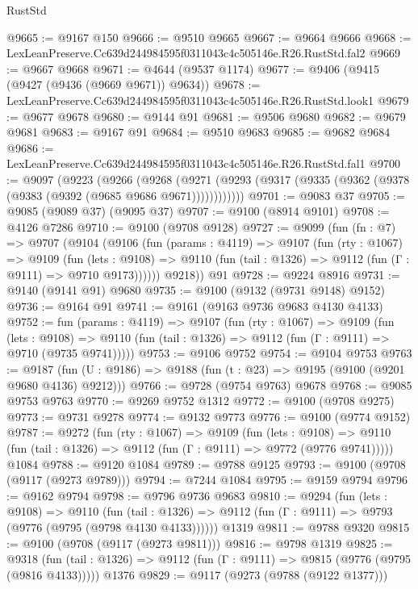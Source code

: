 \begin{lexlean}{RustStd}
\begin{coremodule}
@9665 := @9167 @150
@9666 := @9510 @9665
@9667 := @9664 @9666
@9668 := LexLeanPreserve.Cc639d244984595f0311043c4c505146e.R26.RustStd.fal2
@9669 := @9667 @9668
@9671 := @4644 (@9537 @1174)
@9677 := @9406 (@9415 (@9427 (@9436 (@9669 @9671)) @9634))
@9678 := LexLeanPreserve.Cc639d244984595f0311043c4c505146e.R26.RustStd.look1
@9679 := @9677 @9678
@9680 := @9144 @91
@9681 := @9506 @9680
@9682 := @9679 @9681
@9683 := @9167 @91
@9684 := @9510 @9683
@9685 := @9682 @9684
@9686 := LexLeanPreserve.Cc639d244984595f0311043c4c505146e.R26.RustStd.fal1
@9700 := @9097
    (@9223
      (@9266
        (@9268
          (@9271 (@9293 (@9317 (@9335 (@9362 (@9378 (@9383 (@9392 (@9685 @9686 @9671))))))))))))
@9701 := @9083 @37
@9705 := @9085 (@9089 @37) (@9095 @37)
@9707 := @9100 (@8914 @9101)
@9708 := @4126 @7286
@9710 := @9100 (@9708 @9128)
@9727 := @9099
    (fun (fn : @7) =>
    @9707
      (@9104
        (@9106
          (fun (params : @4119) =>
          @9107
            (fun (rty : @1067) =>
            @9109
              (fun (lets : @9108) =>
              @9110 (fun (tail : @1326) => @9112 (fun (Γ : @9111) => @9710 @9173))))))
        @9218))
    @91
@9728 := @9224 @8916
@9731 := @9140 (@9141 @91) @9680
@9735 := @9100 (@9132 (@9731 @9148) @9152)
@9736 := @9164 @91
@9741 := @9161 (@9163 @9736 @9683 @4130 @4133)
@9752 := fun (params : @4119) =>
  @9107
    (fun (rty : @1067) =>
    @9109
      (fun (lets : @9108) =>
      @9110 (fun (tail : @1326) => @9112 (fun (Γ : @9111) => @9710 (@9735 @9741)))))
@9753 := @9106 @9752
@9754 := @9104 @9753
@9763 := @9187 (fun (U : @9186) => @9188 (fun (t : @23) => @9195 (@9100 (@9201 @9680 @4136) @9212)))
@9766 := @9728 (@9754 @9763) @9678
@9768 := @9085 @9753 @9763
@9770 := @9269 @9752 @1312
@9772 := @9100 (@9708 @9275)
@9773 := @9731 @9278
@9774 := @9132 @9773
@9776 := @9100 (@9774 @9152)
@9787 := @9272
    (fun (rty : @1067) =>
    @9109
      (fun (lets : @9108) =>
      @9110 (fun (tail : @1326) => @9112 (fun (Γ : @9111) => @9772 (@9776 @9741)))))
    @1084
@9788 := @9120 @1084
@9789 := @9788 @9125
@9793 := @9100 (@9708 (@9117 (@9273 @9789)))
@9794 := @7244 @1084
@9795 := @9159 @9794
@9796 := @9162 @9794
@9798 := @9796 @9736 @9683
@9810 := @9294
    (fun (lets : @9108) =>
    @9110
      (fun (tail : @1326) => @9112 (fun (Γ : @9111) => @9793 (@9776 (@9795 (@9798 @4130 @4133))))))
    @1319
@9811 := @9788 @9320
@9815 := @9100 (@9708 (@9117 (@9273 @9811)))
@9816 := @9798 @1319
@9825 := @9318
    (fun (tail : @1326) => @9112 (fun (Γ : @9111) => @9815 (@9776 (@9795 (@9816 @4133)))))
    @1376
@9829 := @9117 (@9273 (@9788 (@9122 @1377)))

\end{coremodule}
\end{lexlean}

